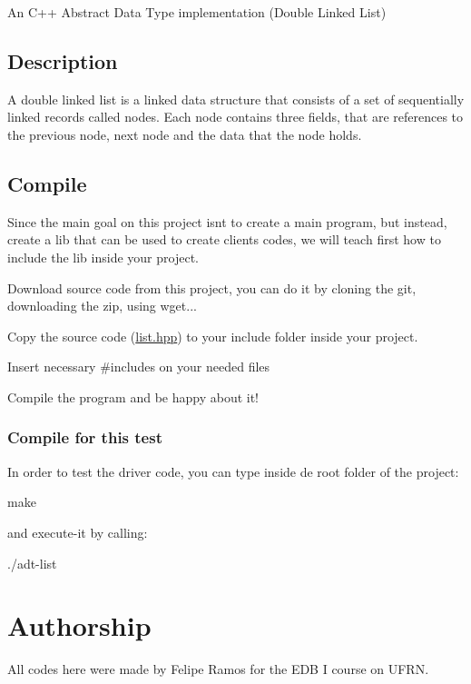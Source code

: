 An C++ Abstract Data Type implementation (Double Linked List)

\subsection*{Description}

A double linked list is a linked data structure that consists of a set of sequentially linked records called nodes. Each node contains three fields, that are references to the previous node, next node and the data that the node holds.

\subsection*{Compile}

Since the main goal on this project isn\textquotesingle{}t to create a main program, but instead, create a lib that can be used to create client\textquotesingle{}s codes, we will teach first how to include the lib inside your project.


\begin{DoxyEnumerate}
\item Download source code from this project, you can do it by cloning the git, downloading the zip, using wget...
\item Copy the source code ({\ttfamily \mbox{\hyperlink{list_8hpp_source}{list.\+hpp}}}) to your include folder inside your project.
\item Insert necessary {\ttfamily \#include}\textquotesingle{}s on your needed files
\item Compile the program and be happy about it!
\end{DoxyEnumerate}

\subsubsection*{Compile for this test}

In order to test the driver code, you can type inside de root folder of the project\+:


\begin{DoxyCode}
make
\end{DoxyCode}


and execute-\/it by calling\+:


\begin{DoxyCode}
./adt-list
\end{DoxyCode}


\section*{Authorship}

All codes here we\textquotesingle{}re made by Felipe Ramos for the E\+DB I course on U\+F\+RN. 